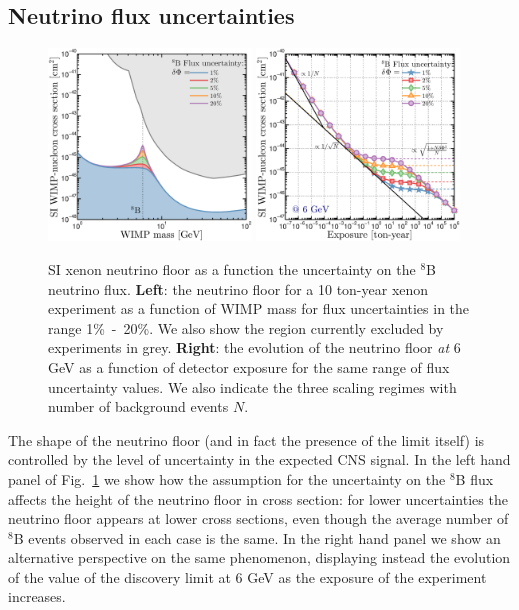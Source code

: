 \subsection{Neutrino flux uncertainties}\label{sec:nufloor_nufluxunc}
\begin{figure}
\begin{center}
\includegraphics[trim = 0mm 0 0mm 0mm, clip, width=0.48\textwidth,angle=0]{Figures/nufloor_fluxerrs.eps}
\includegraphics[trim = 0mm 0 0mm 0mm, clip, width=0.48\textwidth,angle=0]{Figures/nufloor_fluxerrsex.eps}
\caption[Effect of the flux uncertainty on the neutrino floor]{SI xenon neutrino floor as a function the uncertainty on the $^8$B neutrino flux. {\bf Left}: the neutrino floor for a 10 ton-year xenon experiment as a function of WIMP mass for flux uncertainties in the range 1\%~-~20\%. We also show the region currently excluded by experiments in grey. {\bf Right}: the evolution of the neutrino floor {\it at} 6 GeV as a function of detector exposure for the same range of flux uncertainty values. We also indicate the three scaling regimes with number of background events $N$.}
\label{fig:nufluxunc}
\end{center}
\end{figure} 
The shape of the neutrino floor (and in fact the presence of the limit itself) is controlled by the level of uncertainty in the expected CNS signal. In the left hand panel of Fig.~\ref{fig:nufluxunc} we show how the assumption for the uncertainty on the $^8$B flux affects the height of the neutrino floor in cross section: for lower uncertainties the neutrino floor appears at lower cross sections, even though the average number of $^8$B events observed in each case is the same. In the right hand panel we show an alternative perspective on the same phenomenon, displaying instead the evolution of the value of the discovery limit at 6 GeV as the exposure of the experiment increases. 

